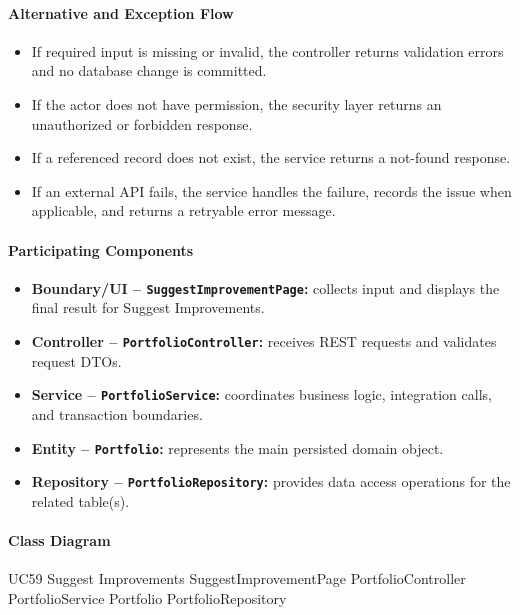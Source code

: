 \paragraph{Alternative and Exception Flow}

\begin{itemize}
    \item If required input is missing or invalid, the controller returns validation errors and no database change is committed.
    \item If the actor does not have permission, the security layer returns an unauthorized or forbidden response.
    \item If a referenced record does not exist, the service returns a not-found response.
    \item If an external API fails, the service handles the failure, records the issue when applicable, and returns a retryable error message.
\end{itemize}

\paragraph{Participating Components}

\begin{itemize}
    \item \textbf{Boundary/UI -- \texttt{SuggestImprovementPage}:} collects input and displays the final result for Suggest Improvements.
    \item \textbf{Controller -- \texttt{PortfolioController}:} receives REST requests and validates request DTOs.
    \item \textbf{Service -- \texttt{PortfolioService}:} coordinates business logic, integration calls, and transaction boundaries.
    \item \textbf{Entity -- \texttt{Portfolio}:} represents the main persisted domain object.
    \item \textbf{Repository -- \texttt{PortfolioRepository}:} provides data access operations for the related table(s).
\end{itemize}

\paragraph{Class Diagram}

\ClassDiagram
{UC59 Suggest Improvements}
{SuggestImprovementPage}
{PortfolioController}
{PortfolioService}
{Portfolio}
{PortfolioRepository}

